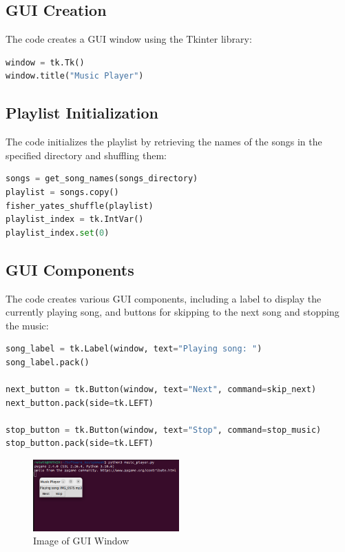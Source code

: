 \documentclass{article}
\begin{document}
\subsection{GUI Creation}
The code creates a GUI window using the Tkinter library:
\begin{lstlisting}[language=Python]
window = tk.Tk()
window.title("Music Player")
\end{lstlisting}

\subsection{Playlist Initialization}
The code initializes the playlist by retrieving the names of the songs in the specified directory and shuffling them:
\begin{lstlisting}[language=Python]
songs = get_song_names(songs_directory)
playlist = songs.copy()
fisher_yates_shuffle(playlist)
playlist_index = tk.IntVar()
playlist_index.set(0)
\end{lstlisting}

\subsection{GUI Components}
The code creates various GUI components, including a label to display the currently playing song, and buttons for skipping to the next song and stopping the music:
\begin{lstlisting}[language=Python]
song_label = tk.Label(window, text="Playing song: ")
song_label.pack()

next_button = tk.Button(window, text="Next", command=skip_next)
next_button.pack(side=tk.LEFT)

stop_button = tk.Button(window, text="Stop", command=stop_music)
stop_button.pack(side=tk.LEFT)
\end{lstlisting}

\begin{figure}
  \centering
  \includegraphics[width=0.5\textwidth]{img_GUI.png}
  \caption{Image of GUI Window}
  \label{fig:img_GUI.png}
\end{figure}
\end{document}
